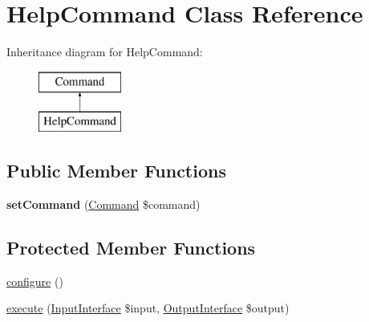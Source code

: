 \hypertarget{class_symfony_1_1_components_1_1_console_1_1_command_1_1_help_command}{
\section{HelpCommand Class Reference}
\label{class_symfony_1_1_components_1_1_console_1_1_command_1_1_help_command}
}
Inheritance diagram for HelpCommand:\begin{figure}[H]
\begin{center}
\leavevmode
\includegraphics[height=2.000000cm]{class_symfony_1_1_components_1_1_console_1_1_command_1_1_help_command}
\end{center}
\end{figure}
\subsection*{Public Member Functions}
\begin{DoxyCompactItemize}
\item 
\hypertarget{class_symfony_1_1_components_1_1_console_1_1_command_1_1_help_command_a680a6b554b91203c0555f73fbf992ecb}{
{\bfseries setCommand} (\hyperlink{class_symfony_1_1_components_1_1_console_1_1_command_1_1_command}{Command} \$command)}
\label{class_symfony_1_1_components_1_1_console_1_1_command_1_1_help_command_a680a6b554b91203c0555f73fbf992ecb}

\end{DoxyCompactItemize}
\subsection*{Protected Member Functions}
\begin{DoxyCompactItemize}
\item 
\hyperlink{class_symfony_1_1_components_1_1_console_1_1_command_1_1_help_command_a9be5e0bdb5720efed6ddb6426c5c16ee}{configure} ()
\item 
\hyperlink{class_symfony_1_1_components_1_1_console_1_1_command_1_1_help_command_ab31c72b72ddaf7116db5d84c055d3c0b}{execute} (\hyperlink{interface_symfony_1_1_components_1_1_console_1_1_input_1_1_input_interface}{InputInterface} \$input, \hyperlink{interface_symfony_1_1_components_1_1_console_1_1_output_1_1_output_interface}{OutputInterface} \$output)
\end{DoxyCompactItemize}

